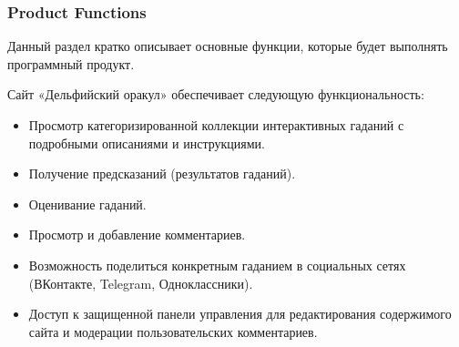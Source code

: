 \subsubsection{Product Functions}

Данный раздел кратко описывает основные функции, которые будет выполнять программный продукт.

Сайт «Дельфийский оракул» обеспечивает следующую функциональность:

\begin{itemize}
    \item Просмотр категоризированной коллекции интерактивных гаданий с подробными описаниями и инструкциями.
    \item Получение предсказаний (результатов гаданий).
    \item Оценивание гаданий.
    \item Просмотр и добавление комментариев.
    \item Возможность поделиться конкретным гаданием в социальных сетях (ВКонтакте, Telegram, Одноклассники).
    \item Доступ к защищенной панели управления для редактирования содержимого сайта и модерации пользовательских комментариев.
\end{itemize}